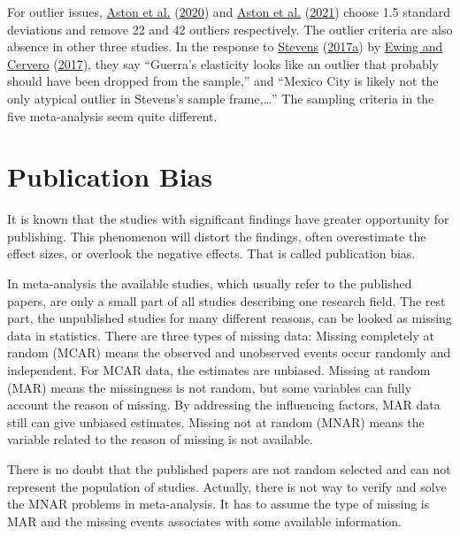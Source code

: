 \documentclass[
  11pt,
  openany]{memoir}
\begin{document}
For outlier issues, \protect\hyperlink{ref-astonStudyDesignImpacts2020}{Aston et al.} (\protect\hyperlink{ref-astonStudyDesignImpacts2020}{2020}) and \protect\hyperlink{ref-astonExploringBuiltEnvironment2021}{Aston et al.} (\protect\hyperlink{ref-astonExploringBuiltEnvironment2021}{2021}) choose 1.5 standard deviations and remove 22 and 42 outliers respectively.
The outlier criteria are also absence in other three studies.
In the response to \protect\hyperlink{ref-stevensDoesCompactDevelopment2017}{Stevens} (\protect\hyperlink{ref-stevensDoesCompactDevelopment2017}{2017a}) by \protect\hyperlink{ref-ewingDoesCompactDevelopment2017}{Ewing and Cervero} (\protect\hyperlink{ref-ewingDoesCompactDevelopment2017}{2017}), they say ``Guerra's elasticity looks like an outlier that probably should have been dropped from the sample,'' and ``Mexico City is likely not the only atypical outlier in Stevens's sample frame,\ldots{}'' The sampling criteria in the five meta-analysis seem quite different.

\hypertarget{publication-bias}{%
\section{Publication Bias}\label{publication-bias}}

It is known that the studies with significant findings have greater opportunity for publishing.
This phenomenon will distort the findings, often overestimate the effect sizes, or overlook the negative effects.
That is called publication bias.

In meta-analysis the available studies, which usually refer to the published papers, are only a small part of all studies describing one research field.
The rest part, the unpublished studies for many different reasons, can be looked as missing data in statistics.
There are three types of missing data: Missing completely at random (MCAR) means the observed and unobserved events occur randomly and independent.
For MCAR data, the estimates are unbiased.
Missing at random (MAR) means the missingness is not random, but some variables can fully account the reason of missing.
By addressing the influencing factors, MAR data still can give unbiased estimates.
Missing not at random (MNAR) means the variable related to the reason of missing is not available.

There is no doubt that the published papers are not random selected and can not represent the population of studies.
Actually, there is not way to verify and solve the MNAR problems in meta-analysis.
It has to assume the type of missing is MAR and the missing events associates with some available information.
\end{document}
